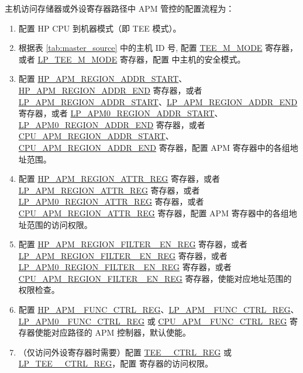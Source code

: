 \documentclass[main\_\_CN.tex]{subfiles}
\begin{document}
主机访问存储器或外设寄存器路径中 APM 管控的配置流程为：

\begin{enumerate}

    \item 配置 HP CPU 到机器模式（即 TEE 模式）。

    \item 根据表 \ref{tab:master_source} 中的主机 ID 号, 配置 \hyperref[fielddesc:TEEMNMODE]{TEE\_M\_MODE} 寄存器，或者 \hyperref[fielddesc:LPTEEM0MODE]{LP\_TEE\_M\_MODE} 寄存器，配置 \chipname{} 中主机的安全模式。

    \item 配置 \hyperref[regdesc:HPAPMREGIONNADDRSTARTREG]{HP\_APM\_REGION\_ADDR\_START}、\hyperref[regdesc:HPAPMREGIONNADDRENDREG]{HP\_APM\_REGION\_ADDR\_END} 寄存器，或者 \hyperref[regdesc:LPAPMREGIONNADDRSTARTREG]{LP\_APM\_REGION\_ADDR\_START}、\hyperref[regdesc:LPAPMREGIONNADDRENDREG]{LP\_APM\_REGION\_ADDR\_END} 寄存器，或者 \hyperref[regdesc:LPAPM0REGIONNADDRSTARTREG]{LP\_APM0\_REGION\_ADDR\_START}、\hyperref[regdesc:LPAPM0REGIONNADDRENDREG]{LP\_APM0\_REGION\_ADDR\_END} 寄存器，或者 \hyperref[regdesc:CPUAPMREGIONNADDRSTARTREG]{CPU\_APM\_REGION\_ADDR\_START}、\hyperref[regdesc:CPUAPMREGIONNADDRENDREG]{CPU\_APM\_REGION\_ADDR\_END} 寄存器，配置 APM 寄存器中的各组地址范围。

    \item 配置 \hyperref[regdesc:HPAPMREGIONNATTRREG]{HP\_APM\_REGION\_ATTR\_REG} 寄存器，或者 \hyperref[regdesc:LPAPMREGIONNATTRREG]{LP\_APM\_REGION\_ATTR\_REG} 寄存器，或者 \hyperref[regdesc:LPAPM0REGIONNATTRREG]{LP\_APM0\_REGION\_ATTR\_REG} 寄存器，或者 \hyperref[regdesc:CPUAPMREGIONNATTRREG]{CPU\_APM\_REGION\_ATTR\_REG} 寄存器，配置 APM 寄存器中的各组地址范围的访问权限。

    \item 配置 \hyperref[fielddesc:HPAPMREGIONFILTEREN]{HP\_APM\_REGION\_FILTER\_ EN\_REG} 寄存器，或者 \hyperref[fielddesc:LPAPMREGIONFILTEREN]{LP\_APM\_REGION\_FILTER\_ EN\_REG} 寄存器，或者 \hyperref[fielddesc:LPAPM0REGIONFILTEREN]{LP\_APM0\_REGION\_FILTER\_ EN\_REG} 寄存器，或者 \hyperref[fielddesc:CPUAPMREGIONFILTEREN]{CPU\_APM\_REGION\_FILTER\_ EN\_REG} 寄存器，使能对应地址范围的权限检查。

    \item 配置 \hyperref[regdesc:HPAPMFUNCCTRLREG]{HP\_APM\_ FUNC\_CTRL\_REG}、\hyperref[regdesc:LPAPMFUNCCTRLREG]{LP\_APM \_FUNC\_CTRL\_REG}、\hyperref[regdesc:LPAPM0FUNCCTRLREG]{LP\_APM0 \_FUNC\_CTRL\_REG} 或 \hyperref[regdesc:CPUAPMFUNCCTRLREG]{CPU\_APM \_FUNC\_CTRL\_REG} 寄存器使能对应路径的 APM 控制器，默认使能。

    \item （仅访问外设寄存器时需要）配置 \hyperref[regdesc:TEEPERICTRLREG]{TEE\_\_CTRL\_REG} 或 \hyperref[regdesc:LPTEEPERICTRLREG]{LP\_TEE\_\_CTRL\_REG}，配置  寄存器的访问权限。

\end{enumerate}
\end{document}
